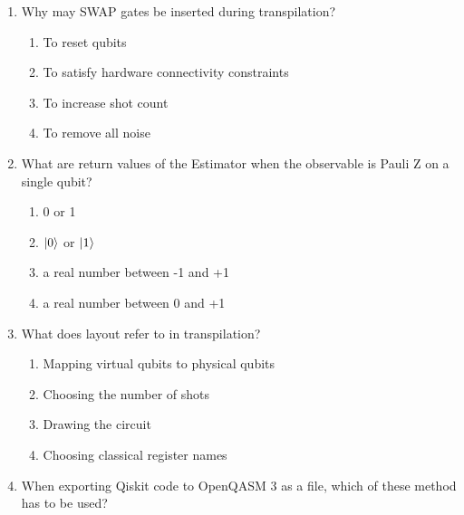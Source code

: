 \documentclass[11pt,a4paper]{article}
\begin{document}
\begin{enumerate}
\begin{lstlisting}[language=Python]
from qiskit import QuantumCircuit
from numpy import pi
qc = QuantumCircuit(1)
qc.reset(0)
qc.sx(0)
qc.rx(pi/2,0)
qc.measure_all()

\end{lstlisting}

\begin{enumerate}[label=\Alph*.]
\item 0.75
\item 0.0
\item 0.5
\item 1.0
\end{enumerate}

\item Why may SWAP gates be inserted during transpilation?

\begin{enumerate}[label=\Alph*.]
\item To reset qubits
\item To satisfy hardware connectivity constraints
\item To increase shot count
\item To remove all noise
\end{enumerate}

\item What are return values of the Estimator when the observable is Pauli Z on a single qubit?

\begin{enumerate}[label=\Alph*.]
\item 0 or 1
\item $\ket{0}$ or $\ket{1}$
\item a real number between -1 and +1
\item a real number between 0 and +1
\end{enumerate}

\item What does layout refer to in transpilation?

\begin{enumerate}[label=\Alph*.]
\item Mapping virtual qubits to physical qubits
\item Choosing the number of shots
\item Drawing the circuit
\item Choosing classical register names
\end{enumerate}

\item When exporting Qiskit code to OpenQASM 3 as a file, which of these method has to be used?


\end{enumerate}
\end{document}
